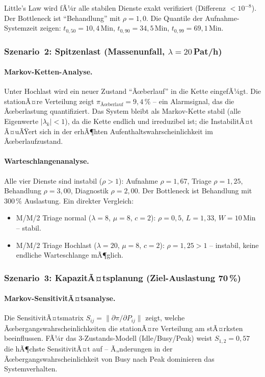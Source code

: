 ﻿\documentclass[a4paper,12pt]{scrreprt}
\theoremstyle{definition}
\begin{document}
Little's Law wird fÃ¼r alle stabilen Dienste exakt verifiziert
(Differenz $< 10^{-8}$). Der Bottleneck ist ``Behandlung'' mit $\rho = 1{,}0$.
Die Quantile der Aufnahme-Systemzeit zeigen:
$t_{0{,}50} = 10{,}4$\,Min, $t_{0{,}90} = 34{,}5$\,Min, $t_{0{,}99} = 69{,}1$\,Min.

\subsubsection{Szenario~2: Spitzenlast (Massenunfall, $\lambda = 20$\,Pat/h)}

\paragraph{Markov-Ketten-Analyse.}
Unter Hochlast wird ein neuer Zustand ``Ãœberlauf'' in die Kette eingefÃ¼gt.
Die stationÃ¤re Verteilung zeigt $\pi_\text{Ãœberlauf} = 9{,}4\,\%$ --
ein Alarmsignal, das die Ãœberlastung quantifiziert. Das System bleibt
als Markov-Kette stabil (alle Eigenwerte $|\lambda_k| < 1$), da die
Kette endlich und irreduzibel ist; die InstabilitÃ¤t Ã¤uÃŸert sich in der
erhÃ¶hten Aufenthaltswahrscheinlichkeit im Ãœberlaufzustand.

\paragraph{Warteschlangenanalyse.}
Alle vier Dienste sind instabil ($\rho > 1$): Aufnahme $\rho = 1{,}67$,
Triage $\rho = 1{,}25$, Behandlung $\rho = 3{,}00$, Diagnostik $\rho = 2{,}00$.
Der Bottleneck ist Behandlung mit $300\,\%$ Auslastung. Ein direkter Vergleich:
\begin{itemize}
	\item[-] M/M/2 Triage normal ($\lambda=8$, $\mu=8$, $c=2$):
	$\rho = 0{,}5$, $L = 1{,}33$, $W = 10$\,Min -- stabil.
	\item[-] M/M/2 Triage Hochlast ($\lambda=20$, $\mu=8$, $c=2$):
	$\rho = 1{,}25 > 1$ -- instabil, keine endliche Warteschlange mÃ¶glich.
\end{itemize}

\subsubsection{Szenario~3: KapazitÃ¤tsplanung (Ziel-Auslastung 70\,\%)}

\paragraph{Markov-SensitivitÃ¤tsanalyse.}
Die SensitivitÃ¤tsmatrix $S_{ij} = \|\partial\pi / \partial P_{ij}\|$ zeigt,
welche Ãœbergangswahrscheinlichkeiten die stationÃ¤re Verteilung am stÃ¤rksten
beeinflussen. FÃ¼r das 3-Zustands-Modell (Idle/Busy/Peak) weist
$S_{1,2} = 0{,}57$ die hÃ¶chste SensitivitÃ¤t auf -- Ã„nderungen in der
Ãœbergangswahrscheinlichkeit von Busy nach Peak dominieren das Systemverhalten.
\end{document}
